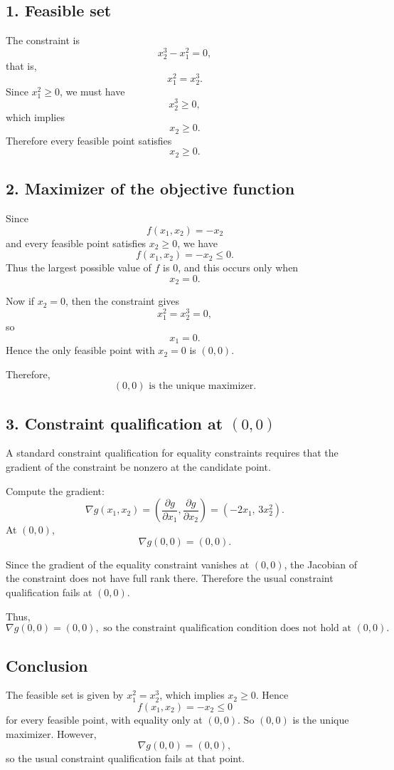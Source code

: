 \subsection*{1. Feasible set}

The constraint is
\[
x_2^3-x_1^2=0,
\]
that is,
\[
x_1^2=x_2^3.
\]
Since \(x_1^2\ge 0\), we must have
\[
x_2^3\ge 0,
\]
which implies
\[
x_2\ge 0.
\]
Therefore every feasible point satisfies
\[
x_2\ge 0.
\]

\subsection*{2. Maximizer of the objective function}

Since
\[
f(x_1,x_2)=-x_2
\]
and every feasible point satisfies \(x_2\ge 0\), we have
\[
f(x_1,x_2)=-x_2\le 0.
\]
Thus the largest possible value of \(f\) is \(0\), and this occurs only when
\[
x_2=0.
\]

Now if \(x_2=0\), then the constraint gives
\[
x_1^2=x_2^3=0,
\]
so
\[
x_1=0.
\]
Hence the only feasible point with \(x_2=0\) is \((0,0)\).

Therefore,
\[
\boxed{(0,0) \text{ is the unique maximizer.}}
\]

\subsection*{3. Constraint qualification at \((0,0)\)}

A standard constraint qualification for equality constraints requires that the gradient of the constraint be nonzero at the candidate point.

Compute the gradient:
\[
\nabla g(x_1,x_2)
=
\left(
\frac{\partial g}{\partial x_1},
\frac{\partial g}{\partial x_2}
\right)
=
(-2x_1,\,3x_2^2).
\]
At \((0,0)\),
\[
\nabla g(0,0)=(0,0).
\]

Since the gradient of the equality constraint vanishes at \((0,0)\), the Jacobian of the constraint does not have full rank there. Therefore the usual constraint qualification fails at \((0,0)\).

Thus,
\[
\boxed{\nabla g(0,0)=(0,0), \text{ so the constraint qualification condition does not hold at } (0,0).}
\]

\subsection*{Conclusion}

The feasible set is given by \(x_1^2=x_2^3\), which implies \(x_2\ge 0\). Hence
\[
f(x_1,x_2)=-x_2\le 0
\]
for every feasible point, with equality only at \((0,0)\). So \((0,0)\) is the unique maximizer. However,
\[
\nabla g(0,0)=(0,0),
\]
so the usual constraint qualification fails at that point.




